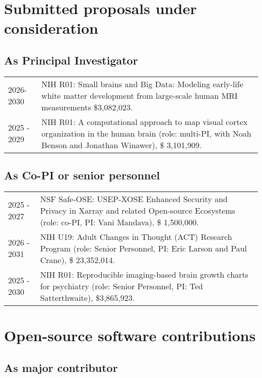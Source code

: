\documentclass[11pt,fullpage]{article}
\begin{document}
\section*{Submitted proposals under consideration}
\subsection*{As Principal Investigator}
\begin{tabular}{p{}p{}}
  2026-2030 & NIH R01: Small brains and Big Data: Modeling early-life white matter development from
  large-scale human MRI measurements \$3,082,023.\\
  2025 - 2029 & NIH R01: A computational approach to map visual cortex organization in the human brain (role: multi-PI, with Noah Benson and Jonathan Winawer), \$ 3,101,909. \\
\end{tabular}

\subsection*{As Co-PI or senior personnel}
\begin{tabular}{p{}p{}}
  2025 - 2027 & NSF Safe-OSE: USEP-XOSE Enhanced Security and Privacy in Xarray and related Open-source Ecosystems (role: co-PI, PI: Vani Mandava), \$ 1,500,000. \\
  2026 - 2031 & NIH U19: Adult Changes in Thought (ACT) Research Program (role: Senior Personnel, PI: Eric Larson and Paul Crane), \$ 23,352,014.\\
  2025 - 2030 & NIH R01: Reproducible imaging-based brain growth charts for psychiatry (role: Senior Personnel, PI: Ted Satterthwaite), \$3,865,923. \\
\end{tabular}

\section*{Open-source software contributions}
  \subsection*{As major contributor}
\end{document}

